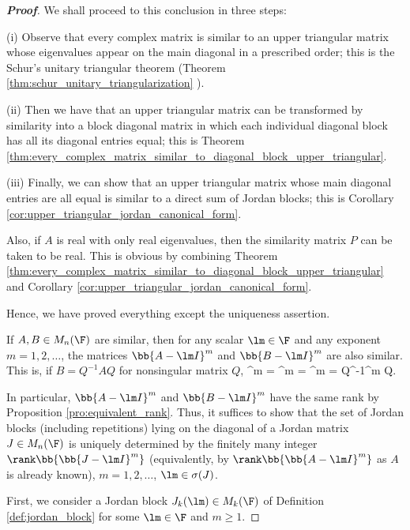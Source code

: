 \begin{proof}[\bf Proof]
We shall proceed to this conclusion in three steps:
\ben
\item [(i)] Observe that every complex matrix is similar to an upper triangular matrix whose eigenvalues appear on the main diagonal in a prescribed order; this is the Schur's unitary triangular
    theorem (Theorem \ref{thm:schur_unitary_triangularization} ).

\item [(ii)] Then we have that an upper triangular matrix can be transformed by similarity into a block diagonal matrix in which each individual diagonal block has all its diagonal entries equal;
    this is Theorem \ref{thm:every_complex_matrix_similar_to_diagonal_block_upper_triangular}.

\item [(iii)] Finally, we can show that an upper triangular matrix whose main diagonal entries are all equal is similar to a direct sum of Jordan blocks; this is Corollary
    \ref{cor:upper_triangular_jordan_canonical_form}.
\een

Also, if $A$ is real with only real eigenvalues, then the similarity matrix $P$ can be taken to be real. This is obvious by combining Theorem
\ref{thm:every_complex_matrix_similar_to_diagonal_block_upper_triangular} and Corollary \ref{cor:upper_triangular_jordan_canonical_form}.

Hence, we have proved everything except the uniqueness assertion.

If $A,B\in M_n(\F)$ are similar, then for any scalar $\lm \in \F$ and any exponent $m=1,2,\dots$, the matrices $\bb{A - \lm I}^m$ and $\bb{B - \lm I}^m$ are also similar. This is, if $B =
Q^{-1}AQ$ for nonsingular matrix $Q$,
\be
{}^m = ^m = ^m = Q^{-1}^m Q.
\ee

In particular, $\bb{A - \lm I}^m$ and $\bb{B - \lm I}^m$ have the same rank by Proposition \ref{pro:equivalent_rank}. Thus, it suffices to show that the set of Jordan blocks (including repetitions)
lying on the diagonal of a Jordan matrix $J\in M_n(\F)$ is uniquely determined by the finitely many integer $\rank\bb{\bb{J-\lm I}^m}$ (equivalently, by $\rank\bb{\bb{A-\lm I}^m}$ as $A$ is already
known), $m = 1,2,\dots$, $\lm \in \sigma(J)$.

First, we consider a Jordan block $J_k(\lm) \in M_k(\F)$ of Definition \ref{def:jordan_block} for some $\lm \in \F$ and $m\geq 1$.


\end{proof}
